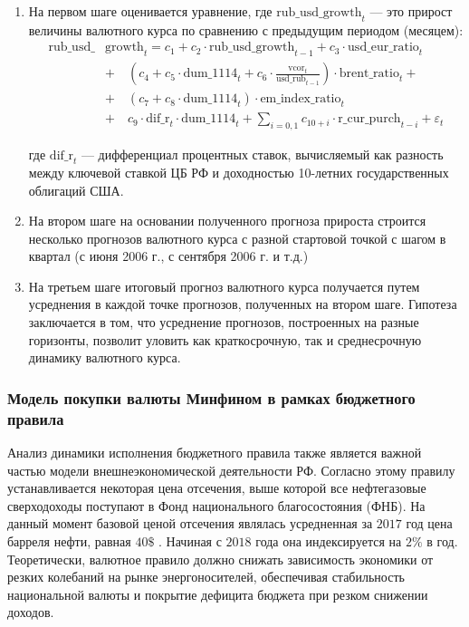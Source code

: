 \documentclass[a4paper, 14pt]{extarticle}
\newcommand{\lsum}{\sum\limits}
\begin{document}
\newpage
\begin{enumerate}
	\item На первом шаге оценивается уравнение, где $\text{rub\_usd\_growth}_{t}$ — это прирост величины валютного курса по сравнению с предыдущим периодом (месяцем):
	\begin{align*}
\text{rub\_usd\_}&\text{growth}_{t} = c_1 + c_2 \cdot \text{rub\_usd\_growth}_{t-1} + c_3 \cdot \text{usd\_eur\_ratio}_{t} \\
& + \quad (c_4 + c_5 \cdot \text{dum\_1114}_t + c_6 \cdot \frac{\text{vcor}_t}{\text{usd\_rub}_{t-1}})\cdot \text{brent\_ratio}_t + \\
&  + \quad (c_7  + c_8 \cdot \text{dum\_1114}_t)\cdot \text{em\_index\_ratio}_t \\   
	& + \quad c_9 \cdot \text{dif\_r}_t \cdot \text{dum\_1114}_t + 
	\lsum_{i = 0, 1} c_{10+i}\cdot\text{r\_cur\_purch}_{t-i} + \varepsilon_{t}
	\end{align*}
	
	где $\text{dif\_r}_t$ — дифференциал процентных ставок, вычисляемый как разность между ключевой ставкой ЦБ РФ и доходностью 10-летних государственных облигаций США.

	\item На втором шаге на основании полученного прогноза прироста строится несколько прогнозов валютного курса с разной стартовой точкой с шагом в квартал (с июня 2006 г., с сентября 2006 г. и т.д.)
	\item На третьем шаге итоговый прогноз валютного курса получается путем усреднения в каждой точке прогнозов, полученных на втором шаге. 
	Гипотеза заключается в том, что усреднение прогнозов, построенных на разные горизонты, позволит уловить как краткосрочную, так и среднесрочную динамику валютного курса.
\end{enumerate}

\subsubsection{Модель покупки валюты Минфином в рамках бюджетного правила}

Анализ динамики исполнения бюджетного правила также является важной частью модели внешнеэкономической деятельности РФ.
Согласно этому правилу устанавливается некоторая цена отсечения, выше которой все нефтегазовые сверходоходы поступают в Фонд национального благосостояния (ФНБ).
На данный момент базовой ценой отсечения являлась усредненная за $2017$ год цена барреля нефти, равная $40\$$ . 
Начиная с $2018$ года она индексируется на $2 \%$ в год.
Теоретически, валютное правило должно снижать зависимость экономики от резких колебаний на рынке энергоносителей, обеспечивая стабильность национальной валюты и покрытие дефицита бюджета при резком снижении доходов.
\end{document}
